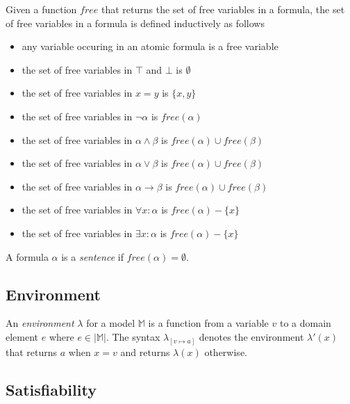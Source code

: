 		Given a function $free$ that returns the set of free variables in a
		formula, the set of free variables in a formula is defined inductively
		as follows
		\begin{itemize}
		\item any variable occuring in an atomic formula is a free variable
		\item the set of free variables in $\top$ and $\bot$ is $\emptyset$
		\item the set of free variables in $x = y$ is $\{x,y\}$
		\item the set of free variables in $\neg\alpha$ is $free(\alpha)$
		\item the set of free variables in $\alpha \wedge \beta$ is $free(\alpha) \cup free(\beta)$
		\item the set of free variables in $\alpha \vee   \beta$ is $free(\alpha) \cup free(\beta)$
		\item the set of free variables in $\alpha \to    \beta$ is $free(\alpha) \cup free(\beta)$
		\item the set of free variables in $\forall x : \alpha$ is $free(\alpha) - \{x\}$
		\item the set of free variables in $\exists x : \alpha$ is $free(\alpha) - \{x\}$
		\end{itemize}
		A formula $\alpha$ is a \emph{sentence} if $free(\alpha) = \emptyset$.

	\subsection{Environment}

		An \emph{environment} $\lambda$ for a model $\mathbb{M}$ is a function
		from a variable $v$ to a domain element $e$ where $e \in |\mathbb{M}|$.
		The syntax $\lambda_{[v \mapsto a]}$ denotes the environment
		$\lambda'(x)$ that returns $a$ when $x=v$ and returns $\lambda(x)$
		otherwise.

	\subsection{Satisfiability}

